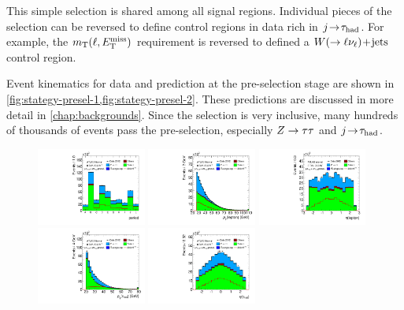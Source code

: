 This simple selection is shared among all signal regions. Individual pieces of the selection can be reversed to define control regions in data rich in $j\!\rightarrow\!\tau_\text{had}$. For example, the $m_\text{T}(\ell, E_{\mathrm{T}}^{\mathrm{miss}})$ requirement is reversed to defined a $W (\rightarrow \ell\nu_\ell)\!+\!\text{jets}$ control region.

Event kinematics for data and prediction at the pre-selection stage are shown in \cref{fig:stategy-presel-1,fig:stategy-presel-2}. These predictions are discussed in more detail in \cref{chap:backgrounds}. Since the selection is very inclusive, many hundreds of thousands of events pass the pre-selection, especially $Z\rightarrow\tau\tau$ and $j\!\rightarrow\!\tau_\text{had}$.

\clearpage

\begin{figure}[tp]
  \centering
  \includegraphics[width=0.32\textwidth]{figures/presel/period}
  \includegraphics[width=0.32\textwidth]{figures/presel/lep-pt-hi}
  \includegraphics[width=0.32\textwidth]{figures/presel/lep-eta} \\
  \includegraphics[width=0.32\textwidth]{figures/presel/tau-pt}
  \includegraphics[width=0.32\textwidth]{figures/presel/tau-eta}

\end{figure}
